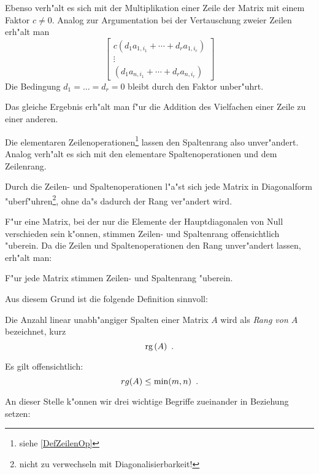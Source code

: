 Ebenso verh"alt es sich mit der Multiplikation einer Zeile der Matrix
mit einem Faktor $c \neq 0$.
Analog zur Argumentation bei der Vertauschung zweier Zeilen erh"alt man
\[
        \left[
             \begin{array}{c}
                 c (d_1 a_{1,{i_1}} + \cdots + d_r a_{1,{i_r}}) \\
                 \vdots \\
                 (d_1 a_{n,{i_1}} + \cdots + d_r a_{n,{i_r}})
             \end{array}
        \right]
\]
\MyPunktA{35em}
Die Bedingung $d_1 = \ldots = d_r = 0$ bleibt durch den Faktor unber"uhrt.

Das gleiche Ergebnis erh"alt man f"ur die Addition des Vielfachen einer
Zeile zu einer anderen.

Die elementaren Zeilenoperationen\footnote{siehe \ref{DefZeilenOp}}
lassen den Spaltenrang also unver"andert.
Analog verh"alt es sich mit den elementare Spaltenoperationen und
dem Zeilenrang.

Durch die Zeilen- und Spaltenoperationen l"a"st sich jede Matrix in
Diagonalform "uberf"uhren\footnote{nicht zu verwechseln mit
Diagonalisierbarkeit!}, ohne da"s dadurch der Rang ver"andert wird.

F"ur eine Matrix, bei der nur die Elemente der Hauptdiagonalen von Null
verschieden sein k"onnen, stimmen Zeilen- und Spaltenrang offensichtlich
"uberein. Da die Zeilen und Spaltenoperationen den Rang unver"andert
lassen, erh"alt man:
\begin{korollar}
\label{SatzRang}
    F"ur jede Matrix stimmen Zeilen- und Spaltenrang "uberein.
\end{korollar}
Aus diesem Grund ist die folgende Definition sinnvoll:

\MyBeginDef
\label{DefRang} 
    Die Anzahl linear unabh"angiger Spalten einer Matrix $A$ wird als
    {\em Rang von $A$} bezeichnet, kurz
    \[ \mbox{\rm rg} \,(A) \mbox{\hspace{0.5em}.} \]
\MyEndDef

Es gilt offensichtlich:
\[ rg(A) \leq \min(m,n) \mbox{\hspace{0.5em}.} \]

An dieser Stelle k"onnen wir drei wichtige Begriffe zueinander in
Beziehung setzen:

